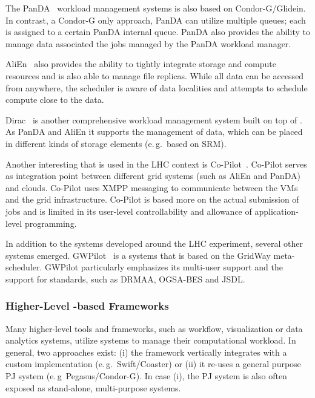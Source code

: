 \documentclass{sig-alternate}
\begin{document}
The PanDA~\cite{1742-6596-331-7-072069} workload management systems is also
based on Condor-G/Glidein. In contrast, a Condor-G only approach,
PanDA can utilize multiple queues; each \pilot is assigned to a certain PanDA
internal queue. PanDA also provides the ability to manage data associated the
jobs managed by the PanDA workload manager.

AliEn~\cite{1742-6596-119-6-062012} also provides the ability to tightly
integrate storage and compute resources and is also able to manage file
replicas. While all data can be accessed from anywhere, the scheduler is aware
of data localities and attempts to schedule compute close to the data.

Dirac~\cite{1742-6596-219-6-062049} is another comprehensive workload
management system built on top of \pilots. As PanDA and AliEn it supports the
management of data, which can be placed in different kinds of storage elements
(e.\,g.\ based on SRM).

Another interesting \pilot that is used in the LHC context is
Co-Pilot~\cite{copilot-tr}. Co-Pilot serves as integration point between
different grid \pilotjob systems (such as AliEn and PanDA) and clouds.
Co-Pilot uses XMPP messaging to communicate between the VMs and the grid
infrastructure. Co-Pilot is based more on the actual submission of jobs and is
limited in its user-level controllability and allowance of application-level
programming.

In addition to the \pilotjob systems developed around the LHC experiment,
several other systems emerged. GWPilot~\cite{gwpilot} is a \pilot systems that
is based on the GridWay meta-scheduler. GWPilot particularly emphasizes its
multi-user support and the support for standards, such as DRMAA, OGSA-BES and
JSDL.

\subsubsection{Higher-Level \pilot-based Frameworks}

Many higher-level tools and frameworks, such as workflow,
visualization or data analytics systems, utilize \pilotjob systems to
manage their computational workload. In general, two approaches exist:
(i) the framework vertically integrates with a custom \pilotjob
implementation (e.\,g.\ Swift/Coaster) or (ii) it re-uses a general
purpose PJ system (e.\,g\ Pegasus/Condor-G). In case (i), the PJ
system is also often exposed as stand-alone, multi-purpose \pilotjob systems.
\end{document}

